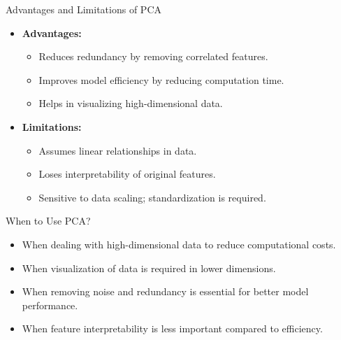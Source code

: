 \documentclass[11pt]{beamer}
\begin{document}
\begin{frame}{Advantages and Limitations of PCA}
    \begin{itemize}
        \item \textbf{Advantages:}
        \begin{itemize}
            \item Reduces redundancy by removing correlated features.
            \item Improves model efficiency by reducing computation time.
            \item Helps in visualizing high-dimensional data.
        \end{itemize}
        \item \textbf{Limitations:}
        \begin{itemize}
            \item Assumes linear relationships in data.
            \item Loses interpretability of original features.
            \item Sensitive to data scaling; standardization is required.
        \end{itemize}
    \end{itemize}
\end{frame}

\begin{frame}{When to Use PCA?}
    \begin{itemize}
        \item When dealing with high-dimensional data to reduce computational costs.
        \item When visualization of data is required in lower dimensions.
        \item When removing noise and redundancy is essential for better model performance.
        \item When feature interpretability is less important compared to efficiency.
    \end{itemize}
\end{frame}
\end{document}
